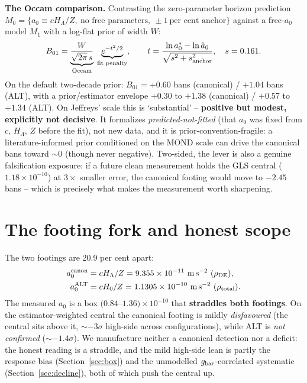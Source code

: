 \documentclass[fleqn,usenatbib]{mnras}
\begin{document}
\textbf{The Occam comparison.} Contrasting the zero-parameter horizon prediction $M_0=\{a_0\equiv cH_\Lambda/Z,\ \text{no free parameters},\ \pm1\ \text{per cent anchor}\}$ against a free-$a_0$ model $M_1$ with a log-flat prior of width $W$:
\begin{equation}
B_{01}=\underbrace{\frac{W}{\sqrt{2\pi}\,s}}_{\text{Occam}}\;\underbrace{e^{-t^2/2}}_{\text{fit penalty}},\qquad t=\frac{\ln a_0^*-\ln\hat a_0}{\sqrt{s^2+s_{\rm anchor}^2}},\quad s=0.161.
\label{eq:occam}
\end{equation}
On the default two-decade prior: $B_{01}=+0.60$ bans (canonical) / $+1.04$ bans (ALT), with a prior/estimator envelope $+0.30$ to $+1.38$ (canonical) / $+0.57$ to $+1.34$ (ALT). On Jeffreys' scale this is `substantial' -- \textbf{positive but modest, explicitly not decisive}. It formalizes \emph{predicted-not-fitted} (that $a_0$ was fixed from $c$, $H_\Lambda$, $Z$ before the fit), not new data, and it is prior-convention-fragile: a literature-informed prior conditioned on the MOND scale can drive the canonical bans toward ${\sim}0$ (though never negative). Two-sided, the lever is also a genuine falsification exposure: if a future clean measurement holds the GLS central ($1.18\times10^{-10}$) at $3\times$ smaller error, the canonical footing would move to $-2.45$ bans -- which is precisely what makes the measurement worth sharpening.


\section{The footing fork and honest scope}
\label{sec:fork}

The two footings are 20.9 per cent apart:
\begin{equation}
\begin{split}
a_0^{\rm canon}&=cH_\Lambda/Z=9.355\times10^{-11}\ {\rm m\,s^{-2}}\ (\rho_{\rm DE}),\\
a_0^{\rm ALT}&=cH_0/Z=1.1305\times10^{-10}\ {\rm m\,s^{-2}}\ (\rho_{\rm total}).
\end{split}
\label{eq:forkdef}
\end{equation}
The measured $a_0$ is a box $(0.84$--$1.36)\times10^{-10}$ that \textbf{straddles both footings}. On the estimator-weighted central the canonical footing is mildly \emph{disfavoured} (the central sits above it, ${\sim}{-3}\sigma$ high-side across configurations), while ALT is \emph{not confirmed} (${\sim}{-1.4}\sigma$). We manufacture neither a canonical detection nor a deficit: the honest reading is a straddle, and the mild high-side lean is partly the response bias (Section~\ref{sec:box}) and the unmodelled $g_{\rm bar}$-correlated systematic (Section~\ref{sec:decline}), both of which push the central up.
\end{document}

